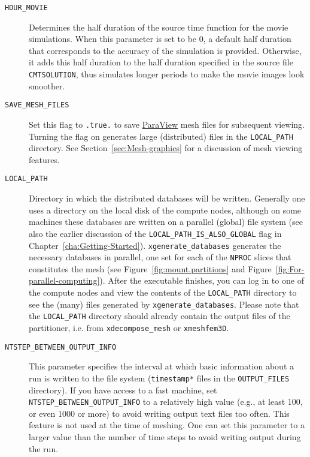 \begin{description}
\item [{\texttt{HDUR\_MOVIE}}] Determines the half duration of the source
time function for the movie simulations. When this parameter is set
to be 0, a default half duration that corresponds to the accuracy
of the simulation is provided. Otherwise, it adds this half duration
to the half duration specified in the source file \texttt{CMTSOLUTION},
thus simulates longer periods to make the movie images look smoother.
\item [{\texttt{SAVE\_MESH\_FILES}}] Set this flag to \texttt{.true.} to
save \href{www.paraview.org}{ParaView} mesh files for
subsequent viewing. Turning the flag on generates large (distributed)
files in the \texttt{LOCAL\_PATH} directory. See Section~\ref{sec:Mesh-graphics}
for a discussion of mesh viewing features.
\item [{\texttt{LOCAL\_PATH}}] Directory in which the distributed databases
will be written. Generally one uses a directory on the local disk
of the compute nodes, although on some machines these databases are
written on a parallel (global) file system (see also the earlier discussion
of the \texttt{LOCAL\_PATH\_IS\_ALSO\_GLOBAL} flag in Chapter~\ref{cha:Getting-Started}).
\texttt{xgenerate\_databases} generates the necessary databases in
parallel, one set for each of the \texttt{NPROC} slices that constitutes
the mesh (see Figure~\ref{fig:mount.partitions} and Figure~\ref{fig:For-parallel-computing}).
After the executable finishes, you can log in to one of the compute
nodes and view the contents of the \texttt{LOCAL\_PATH} directory
to see the (many) files generated by \texttt{xgenerate\_databases}.
Please note that the \texttt{LOCAL\_PATH} directory should already
contain the output files of the partitioner, i.e. from \texttt{xdecompose\_mesh}
or \texttt{xmeshfem3D}.
\item [{\texttt{NTSTEP\_BETWEEN\_OUTPUT\_INFO}}] This parameter specifies
the interval at which basic information about a run is written to
the file system (\texttt{timestamp{*}} files in the \texttt{OUTPUT\_FILES}
directory). If you have access to a fast machine, set \texttt{NTSTEP\_BETWEEN\_OUTPUT\_INFO}
to a relatively high value (e.g., at least 100, or even 1000 or more)
to avoid writing output text files too often. This feature is not
used at the time of meshing. One can set this parameter to a larger
value than the number of time steps to avoid writing output during
the run.
\end{description}

